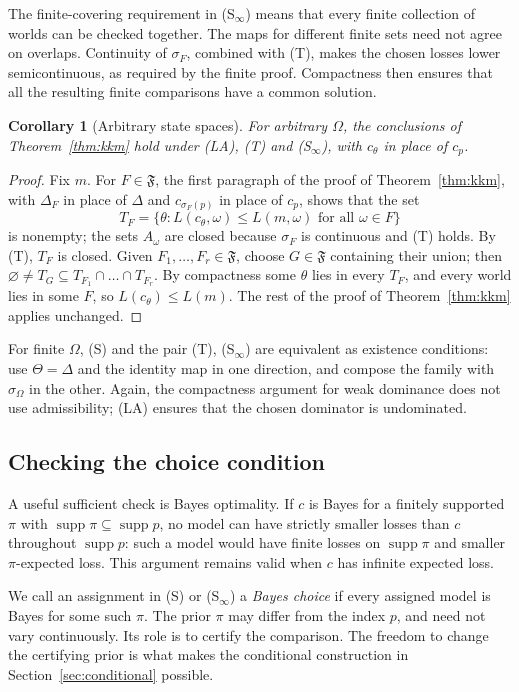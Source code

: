 \documentclass[11pt]{article}
\newtheorem{corollary}[theorem]{Corollary}
\theoremstyle{definition}
\theoremstyle{remark}
\newcommand{\F}{\mathfrak F}
\newcommand{\supp}{\operatorname{supp}}
\begin{document}
The finite-covering requirement in (S$_\infty$) means that every finite collection of worlds can be checked together. The maps for different finite sets need not agree on overlaps. Continuity of $\sigma_F$, combined with (T), makes the chosen losses lower semicontinuous, as required by the finite proof. Compactness then ensures that all the resulting finite comparisons have a common solution.
\begin{corollary}[Arbitrary state spaces]\label{cor:infinite}
For arbitrary $\Omega$, the conclusions of Theorem~\ref{thm:kkm} hold under (LA), (T) and (S$_\infty$), with $c_\theta$ in place of $c_p$.
\end{corollary}
\begin{proof}
Fix $m$. For $F\in\F$, the first paragraph of the proof of Theorem~\ref{thm:kkm}, with $\Delta_F$ in place of $\Delta$ and $c_{\sigma_F(p)}$ in place of $c_p$, shows that the set
\[
 T_F=\{\theta:L(c_\theta,\omega)\le L(m,\omega)\text{ for all }\omega\in F\}
\]
is nonempty; the sets $A_\omega$ are closed because $\sigma_F$ is continuous and (T) holds. By (T), $T_F$ is closed. Given $F_1,\dots,F_r\in\F$, choose $G\in\F$ containing their union; then $\varnothing\ne T_G\subseteq T_{F_1}\cap\dots\cap T_{F_r}$. By compactness some $\theta$ lies in every $T_F$, and every world lies in some $F$, so $L(c_\theta)\le L(m)$. The rest of the proof of Theorem~\ref{thm:kkm} applies unchanged.
\end{proof}

For finite $\Omega$, (S) and the pair (T), (S$_\infty$) are equivalent as existence conditions: use $\Theta=\Delta$ and the identity map in one direction, and compose the family with $\sigma_\Omega$ in the other. Again, the compactness argument for weak dominance does not use admissibility; (LA) ensures that the chosen dominator is undominated.

\subsection{Checking the choice condition}\label{rem:bayes-S}
A useful sufficient check is Bayes optimality. If $c$ is Bayes for a finitely supported $\pi$ with $\supp\pi\subseteq\supp p$, no model can have strictly smaller losses than $c$ throughout $\supp p$: such a model would have finite losses on $\supp\pi$ and smaller $\pi$-expected loss. This argument remains valid when $c$ has infinite expected loss.

We call an assignment in (S) or (S$_\infty$) a \emph{Bayes choice} if every assigned model is Bayes for some such $\pi$. The prior $\pi$ may differ from the index $p$, and need not vary continuously. Its role is to certify the comparison. The freedom to change the certifying prior is what makes the conditional construction in Section~\ref{sec:conditional} possible.
\end{document}

